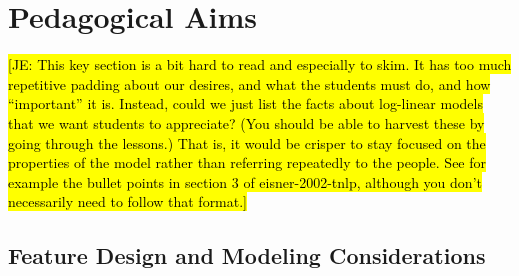 \documentclass[11pt,letterpaper]{article}
\newcommand{\Note}[1]{}
\renewcommand{\Note}[1]{\hl{[#1]}}
\newcommand{\NoteSigned}[3]{{\sethlcolor{#2}\Note{#1: #3}}}
\newcommand{\NoteJE}[1]{\NoteSigned{JE}{LightGreen}{#1}}
\newcommand{\Commented}[1]{}
\begin{document}
%
%
%


\section{Pedagogical Aims}\label{sec:aims}

\NoteJE{This key section is a bit hard to read and especially to skim.
  It has too much repetitive padding about our desires, and what the
  students must do, and how ``important'' it is.  Instead, could we
  just list the facts about log-linear models that we want students to
  appreciate?  (You should be able to harvest these by going through
  the lessons.)  That is, it would be crisper to stay focused on the
  properties of the model rather than referring repeatedly to the
  people.  See for example the bullet points in section 3 of
  eisner-2002-tnlp, although you don't necessarily need to follow that
  format.}

\Commented{We wish to make log-linear models a concept that students can reason
about quickly and intuitively. We found that expanding upon the
difficulties from Section \ref{sec:challenges} and listing specific
pedagogical goals helped focus the design of the virtual manipulative
and hone the creation and expected take-aways of individual
lessons.
\NoteJE{True but boringly meta. We also used section headers
because we found them useful to organize the paper, but we don't
have to say so. :-) Just list the goals or better yet the facts.
They'll speak for themselves.}
}

\subsection{Feature Design and Modeling Considerations}
\end{document}
